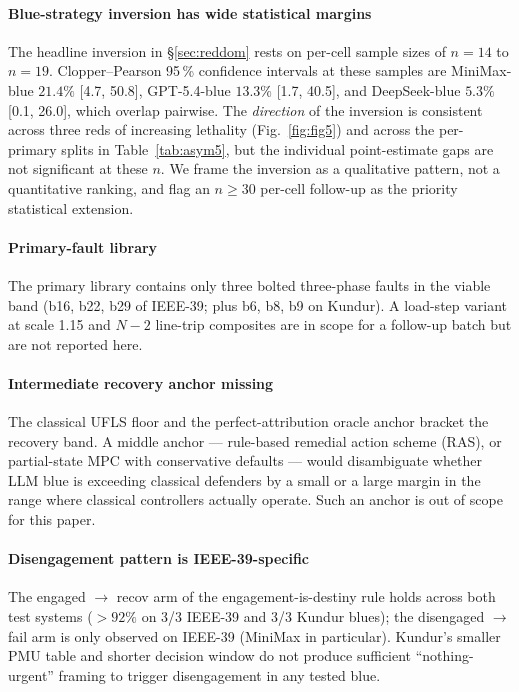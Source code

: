 \documentclass[journal,twocolumn,10pt]{IEEEtran}
\begin{document}
\paragraph*{Blue-strategy inversion has wide statistical margins} The headline inversion in \S\ref{sec:reddom} rests on per-cell sample sizes of $n = 14$ to $n = 19$. Clopper--Pearson 95\,\% confidence intervals at these samples are MiniMax-blue $21.4\%$ [4.7, 50.8], GPT-5.4-blue $13.3\%$ [1.7, 40.5], and DeepSeek-blue $5.3\%$ [0.1, 26.0], which overlap pairwise. The \emph{direction} of the inversion is consistent across three reds of increasing lethality (Fig.~\ref{fig:fig5}) and across the per-primary splits in Table~\ref{tab:asym5}, but the individual point-estimate gaps are not significant at these $n$. We frame the inversion as a qualitative pattern, not a quantitative ranking, and flag an $n \geq 30$ per-cell follow-up as the priority statistical extension.

\paragraph*{Primary-fault library} The primary library contains only three bolted three-phase faults in the viable band (b16, b22, b29 of IEEE-39; plus b6, b8, b9 on Kundur). A load-step variant at scale 1.15 and $N-2$ line-trip composites are in scope for a follow-up batch but are not reported here.

\paragraph*{Intermediate recovery anchor missing} The classical UFLS floor and the perfect-attribution oracle anchor bracket the recovery band. A middle anchor --- rule-based remedial action scheme (RAS), or partial-state MPC with conservative defaults --- would disambiguate whether LLM blue is exceeding classical defenders by a small or a large margin in the range where classical controllers actually operate. Such an anchor is out of scope for this paper.

\paragraph*{Disengagement pattern is IEEE-39-specific} The engaged $\to$ recov arm of the engagement-is-destiny rule holds across both test systems ($> 92\%$ on 3/3 IEEE-39 and 3/3 Kundur blues); the disengaged $\to$ fail arm is only observed on IEEE-39 (MiniMax in particular). Kundur's smaller PMU table and shorter decision window do not produce sufficient ``nothing-urgent'' framing to trigger disengagement in any tested blue.
\end{document}
